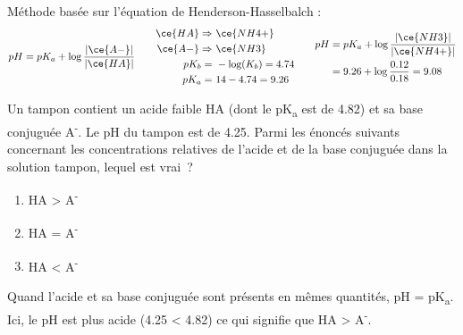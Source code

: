 \documentclass[
  11pt,
  french,
  a4paper,
  openany]{book}
\providecommand{\tightlist}{%
  \setlength{\itemsep}{0pt}\setlength{\parskip}{0pt}}
\begin{document}
\begin{Answer}
Méthode basée sur l'équation de Henderson-Hasselbalch :
\[
\begin{split}
  pH = pK_a + \log \frac{|\ce{A-}|}{|\ce{HA}|}
\end{split}
\qquad
\begin{split}
  \ce{HA} \Rightarrow &\ \ce{NH4+} \\
  \ce{A-} \Rightarrow &\ \ce{NH3} \\
  pK_b = &\ -\log(K_b) = 4.74 \\
  pK_a = &\ 14 - 4.74 = 9.26
\end{split}
\qquad
\begin{split}
  pH &= pK_a + \log \frac{|\ce{NH3}|}{|\ce{NH4+}|} \\
  &= 9.26 + \log \frac{0.12}{0.18} = 9.08 \\
\end{split}
\]

\end{Answer}

\begin{Exercise}

Un tampon contient un acide faible HA (dont le pK\textsubscript{a} est de 4.82) et sa base conjuguée A\textsuperscript{-}. Le pH du tampon est de 4.25. Parmi les énoncés suivants concernant les concentrations relatives de l'acide et de la base conjuguée dans la solution tampon, lequel est vrai~?

\begin{enumerate}
\def\labelenumi{\alph{enumi}.}
\tightlist
\item
  \textbar HA\textbar{} \textgreater{} \textbar A\textsuperscript{-}\textbar{}
\item
  \textbar HA\textbar{} = \textbar A\textsuperscript{-}\textbar{}
\item
  \textbar HA\textbar{} \textless{} \textbar A\textsuperscript{-}\textbar{}
\end{enumerate}


\end{Exercise}

\begin{Answer}
Quand l'acide et sa base conjuguée sont présents en mêmes quantités, pH = pK\textsubscript{a}. Ici, le pH est plus acide (4.25 \textless{} 4.82) ce qui signifie que \textbar HA\textbar{} \textgreater{} \textbar A\textsuperscript{-}\textbar.

\end{Answer}

\clearpage
\end{document}
